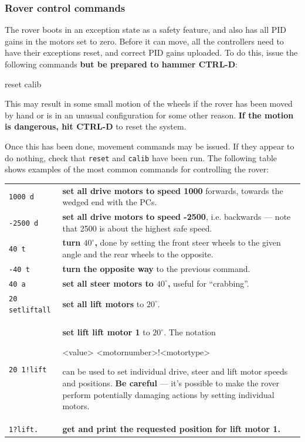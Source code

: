 \subsubsection{Rover control commands}
\label{angcont}
The rover boots in an exception state as a safety feature, and also has all PID gains in the motors
set to zero. Before it can move, all the controllers need to have their exceptions reset, and correct
PID gains uploaded. To do this, issue the following commands \textbf{but be prepared to hammer CTRL-D}:
\begin{v}
reset calib
\end{v}
This may result in some small motion of the wheels if the rover has been moved by hand or is
in an unusual configuration for some other reason. \textbf{If the motion is dangerous, hit CTRL-D} to
reset the system.

Once this has been done, movement commands may be issued. If they appear to do nothing, check
that \texttt{reset} and \texttt{calib} have been run.
The following table shows examples of the most common commands for controlling the rover:

\begin{tabular}{|l|p{4in}|} \hline  
\texttt{1000 d} & \textbf{set all drive motors to speed 1000} forwards, towards the wedged end with the PCs.\\
\texttt{-2500 d} & \textbf{set all drive motors to speed -2500}, i.e. backwards --- note that 2500 is about the highest safe speed.\\
\texttt{40 t} & \textbf{turn $40^\circ$,} done by setting the front steer wheels to the given angle and the rear wheels to
the opposite.\\
\texttt{-40 t} & \textbf{turn the opposite way} to the previous command.\\
\texttt{40 a} & \textbf{set all steer motors to $40^\circ$,} useful for ``crabbing''.\\
\texttt{20 setliftall} & \textbf{set all lift motors} to $20^\circ$.\\
\texttt{20 1!lift} & \textbf{set lift lift motor 1} to $20^\circ$. The notation
\begin{v}
<value> <motornumber>!<motortype>
\end{v}
can be used to set individual drive, steer and lift motor speeds and positions. \textbf{Be careful} ---
it's possible to make the rover perform potentially damaging actions by setting individual motors.\\
\texttt{1?lift.} & \textbf{get and print the requested position for lift motor 1.}
\\ \hline
\end{tabular}

